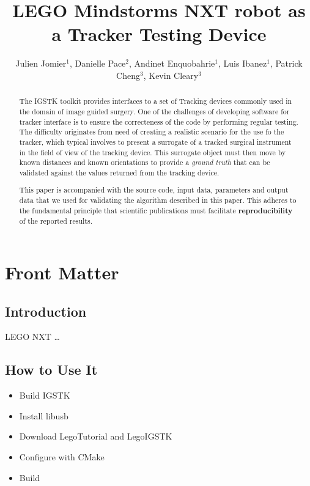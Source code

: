 \documentclass{InsightArticle}
\title{LEGO Mindstorms NXT robot as a Tracker Testing Device}
\author{Julien Jomier$^{1}$, Danielle Pace$^{2}$, Andinet Enquobahrie$^{1}$, Luis Ibanez$^{1}$, Patrick Cheng$^{3}$, Kevin Cleary$^{3}$}
\newcommand{\IJhandlerIDnumber}{1338}
\begin{document}
%
% 
\IJhandlefooter{\IJhandlerIDnumber}


\ifpdf
\else
\fi


\maketitle


\ifhtml
\chapter*{Front Matter\label{front}}
\fi


\begin{abstract}
\noindent
The IGSTK toolkit provides interfaces to a set of Tracking devices commonly
used in the domain of image guided surgery. One of the challenges of developing
software for tracker interface is to ensure the correcteness of the code by
performing regular testing. The difficulty originates from need of creating a
realistic scenario for the use fo the tracker, which typical involves to
present a surrogate of a tracked surgical instrument in the field of view of
the tracking device. This surrogate object must then move by known distances
and known orientations to provide a \emph{ground truth} that can be validated
against the values returned from the tracking device.

This paper is accompanied with the source code, input data, parameters and
output data that we used for validating the algorithm described in this paper.
This adheres to the fundamental principle that scientific publications must
facilitate \textbf{reproducibility} of the reported results.
\end{abstract}

\tableofcontents

\section{Introduction}

LEGO NXT \ldots

\section{How to Use It}

\begin{itemize}
\item Build IGSTK
\item Install libusb
\item Download LegoTutorial and LegoIGSTK
\item Configure with CMake
\item Build
\end{itemize}
\end{document}
